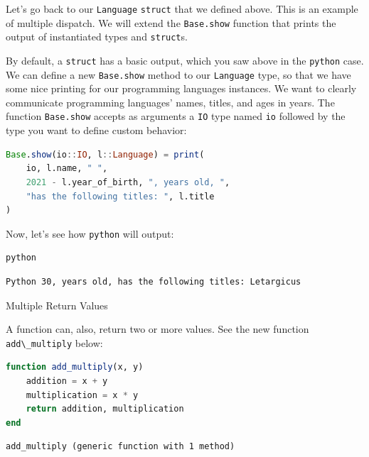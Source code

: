 \documentclass[
  notoc %
]{tufte-book}
\makeatletter
\newcommand{\passthrough}[1]{#1}
\renewcommand\subsubsection{%
\@startsection{subsubsection}{3}{\z@ }{-3.25ex\@plus -1ex \@minus -.2ex}{1.5ex \@plus .2ex}{\normalfont \normalsize \bfseries }
}
\makeatother
\begin{document}
Let's go back to our \passthrough{\lstinline!Language!}
\passthrough{\lstinline!struct!} that we defined above. This is an
example of multiple dispatch. We will extend the
\passthrough{\lstinline!Base.show!} function that prints the output of
instantiated types and \passthrough{\lstinline!struct!}s.

By default, a \passthrough{\lstinline!struct!} has a basic output, which
you saw above in the \passthrough{\lstinline!python!} case. We can
define a new \passthrough{\lstinline!Base.show!} method to our
\passthrough{\lstinline!Language!} type, so that we have some nice
printing for our programming languages instances. We want to clearly
communicate programming languages' names, titles, and ages in years. The
function \passthrough{\lstinline!Base.show!} accepts as arguments a
\passthrough{\lstinline!IO!} type named \passthrough{\lstinline!io!}
followed by the type you want to define custom behavior:

\begin{lstlisting}[language=Julia]
Base.show(io::IO, l::Language) = print(
    io, l.name, " ",
    2021 - l.year_of_birth, ", years old, ",
    "has the following titles: ", l.title
)
\end{lstlisting}

Now, let's see how \passthrough{\lstinline!python!} will output:

\begin{lstlisting}[language=Julia]
python
\end{lstlisting}

\begin{lstlisting}[language=Output]
Python 30, years old, has the following titles: Letargicus
\end{lstlisting}

\hypertarget{sec:function_multiple}{%
\subsubsection{Multiple Return Values}\label{sec:function_multiple}}

A function can, also, return two or more values. See the new function
\passthrough{\lstinline!add\_multiply!} below:

\begin{lstlisting}[language=Julia]
function add_multiply(x, y)
    addition = x + y
    multiplication = x * y
    return addition, multiplication
end
\end{lstlisting}

\begin{lstlisting}[language=Output]
add_multiply (generic function with 1 method)
\end{lstlisting}
\end{document}
